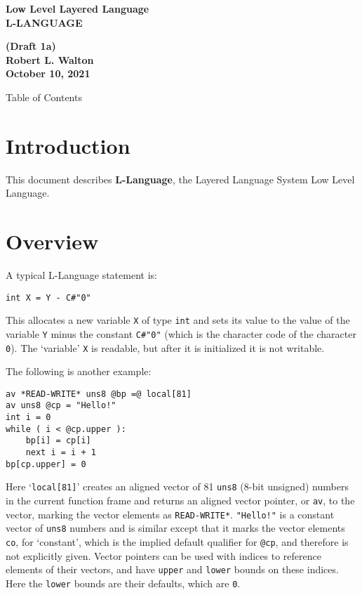 \documentclass[12pt]{article}
\makeatletter
\renewcommand\tableofcontents{%
    \begin{list}{}%
	     {\setlength{\itemsep}{0in}%
	      \setlength{\topsep}{0in}%
	      \setlength{\parsep}{1ex}%
	      \setlength{\labelwidth}{0in}%
	      \setlength{\baselineskip}{1.5ex}%
	      \setlength{\leftmargin}{0.8in}%
	      \setlength{\rightmargin}{0.8in}}%
    \item\@starttoc{toc}%
    \end{list}}
\newcommand{\key}[1]{{\rm \bfseries #1}}
\newenvironment{indpar}[1][0.3in]%
	{\begin{list}{}%
		     {\setlength{\itemsep}{0in}%
		      \setlength{\topsep}{0in}%
		      \setlength{\parsep}{1ex}%
		      \setlength{\labelwidth}{#1}%
		      \setlength{\leftmargin}{#1}%
		      \addtolength{\leftmargin}{\labelsep}}%
	 \item}%
	{\end{list}}
\makeatother
\begin{document}
        
\begin{center}
\Large \bf
Low Level Layered Language\\[0.5ex]
\huge \bf
L-LANGUAGE
\end{center}
\begin{center}
\large \bf
(Draft 1a)
\\[0.5ex]
Robert L. Walton\\
October 10, 2021

\bigskip
 
Table of Contents
\end{center}

\bigskip

\tableofcontents 

\newpage

\section{Introduction}

This document describes \key{L-Language}, the Layered Language
System Low Level Language.

\section{Overview}

A typical L-Language statement is:
\begin{indpar}\begin{verbatim}
int X = Y - C#"0"
\end{verbatim}\end{indpar}
This allocates a new variable {\tt X} of type {\tt int}
and sets its value to the value of the
variable {\tt Y} minus the constant {\tt C\#"0"} (which is
the character code of the character {\tt 0}).
The `variable' {\tt X} is readable, but after it is
initialized it is not writable.

The following is another example:
\begin{indpar}\begin{verbatim}
av *READ-WRITE* uns8 @bp =@ local[81]
av uns8 @cp = "Hello!"
int i = 0
while ( i < @cp.upper ):
    bp[i] = cp[i]
    next i = i + 1
bp[cp.upper] = 0
\end{verbatim}\end{indpar}

Here `{\tt local[81]}' creates an aligned vector of
81 {\tt uns8} (8-bit unsigned) numbers in the current function
frame and returns an aligned vector pointer, or {\tt av}, to
the vector, marking the vector elements as {\tt *READ-WRITE*}.
{\tt "Hello!"} is a constant vector of {\tt uns8} numbers
and is similar except that it marks the vector elements
{\tt co}, for `constant', which is the implied default qualifier
for {\tt @cp}, and therefore
is not explicitly given.
Vector pointers can be used with indices
to reference elements of their vectors, and have {\tt upper} and
{\tt lower} bounds on these indices.  Here the {\tt lower} bounds
are their defaults, which are {\tt 0}.
\end{document}
